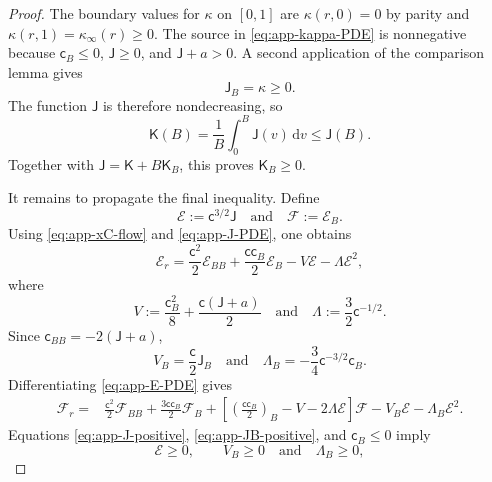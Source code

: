 \documentclass[10pt]{amsart}
\theoremstyle{definition}
\theoremstyle{remark}
\numberwithin{equation}{section}
\newcommand{\1}{\mathbf 1}
\newcommand{\dd}{\,\mathrm d}
\begin{document}
\begin{proof}
The boundary values for $\kappa$ on $[0,1]$ are $\kappa(r,0)=0$ by parity and $\kappa(r,1)=\kappa_\infty(r)\geq0$.  The source in \eqref{eq:app-kappa-PDE} is nonnegative because $\mathsf c_B\leq0$, $\mathsf J\geq0$, and $\mathsf J+a>0$.  A second application of the comparison lemma gives
\begin{equation}
 \mathsf J_B=\kappa\geq0.
 \label{eq:app-JB-positive}
\end{equation}
The function $\mathsf J$ is therefore nondecreasing, so
\begin{equation*}
 \mathsf K(B)=\frac1B\int_0^B\mathsf J(v)\dd v\leq \mathsf J(B).
\end{equation*}
Together with $\mathsf J=\mathsf K+B\mathsf K_B$, this proves $\mathsf K_B\geq0$.

It remains to propagate the final inequality.  Define
\begin{equation*}
 \mathcal E:=\mathsf c^{3/2}\mathsf J\quad\text{and}\quad \mathcal F:=\mathcal E_B.
\end{equation*}
Using \eqref{eq:app-xC-flow} and \eqref{eq:app-J-PDE}, one obtains
\begin{equation}
 \mathcal E_r
 =\frac{\mathsf c^2}{2}\mathcal E_{BB}
 +\frac{\mathsf c\mathsf c_B}{2}\mathcal E_B
 -V\mathcal E-\Lambda\mathcal E^2,
 \label{eq:app-E-PDE}
\end{equation}
where
\begin{equation*}
 V:=\frac{\mathsf c_B^2}{8}+\frac{\mathsf c(\mathsf J+a)}2\quad\text{and}\quad
 \Lambda:=\frac32\mathsf c^{-1/2}.
\end{equation*}
Since $\mathsf c_{BB}=-2(\mathsf J+a)$,
\begin{equation}
 V_B=\frac{\mathsf c}{2}\mathsf J_B\quad\text{and}\quad
 \Lambda_B=-\frac34\mathsf c^{-3/2}\mathsf c_B.
 \label{eq:app-VLambda-derivatives}
\end{equation}
Differentiating \eqref{eq:app-E-PDE} gives
\begin{align}
 \mathcal F_r={}&\frac{\mathsf c^2}{2}\mathcal F_{BB}
 +\frac{3\mathsf c\mathsf c_B}{2}\mathcal F_B
 +\left[\left(\frac{\mathsf c\mathsf c_B}{2}\right)_B
      -V-2\Lambda\mathcal E\right]\mathcal F
 -V_B\mathcal E-\Lambda_B\mathcal E^2.
 \label{eq:app-F-PDE}
\end{align}
Equations \eqref{eq:app-J-positive}, \eqref{eq:app-JB-positive}, and $\mathsf c_B\leq0$ imply
\begin{equation*}
 \mathcal E\geq0,\qquad V_B\geq0\quad\text{and}\quad \Lambda_B\geq0,
\end{equation*}

\end{proof}
\end{document}
